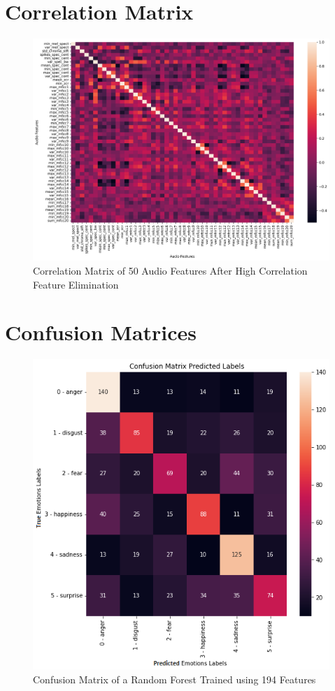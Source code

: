 \section{Correlation Matrix}

\begin{figure}[H]
	\centering
	\includegraphics[width=\linewidth]{figs/appendix/feature_selection/corrMatrix.png}
	\caption{Correlation Matrix of 50 Audio Features After High Correlation Feature Elimination}
	\label{fig:corrMatrix}
\end{figure}

\section{Confusion Matrices}  \label{confusionMatrices}

\begin{figure}[H]
	\centering
	\includegraphics[width=.55\linewidth]{figs/appendix/feature_selection/cmAll.png}
	\caption{Confusion Matrix of a Random Forest Trained using 194 Features}
	\label{fig:confMatrix1}
\end{figure}

